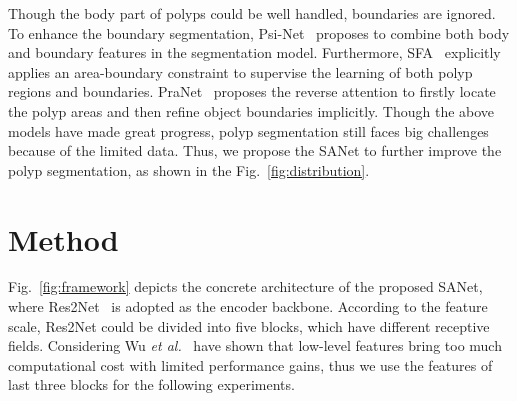 \documentclass[runningheads]{llncs}
\begin{document}
Though the body part of polyps could be well handled, boundaries are ignored. To enhance the boundary segmentation, Psi-Net~\cite{murugesan2019psi} proposes to combine both body and boundary features in the segmentation model. Furthermore, SFA~\cite{fang2019selective} explicitly applies an area-boundary constraint to supervise the learning of both polyp regions and boundaries. PraNet~\cite{fan2020pranet} proposes the reverse attention to firstly locate the polyp areas and then refine object boundaries implicitly. Though the above models have made great progress, polyp segmentation still faces big challenges because of the limited data. Thus, we propose the SANet to further improve the polyp segmentation, as shown in the Fig.~\ref{fig:distribution}.

\section{Method}
Fig.~\ref{fig:framework} depicts the concrete architecture of the proposed SANet, where Res2Net~\cite{GaoCZZYT21} is adopted as the encoder backbone. According to the feature scale, Res2Net could be divided into five blocks, which have different receptive fields. Considering Wu {\it et al.}~\cite{CPD} have shown that low-level features bring too much computational cost with limited performance gains, thus we use the features of last three blocks  for the following experiments. 
\end{document}
